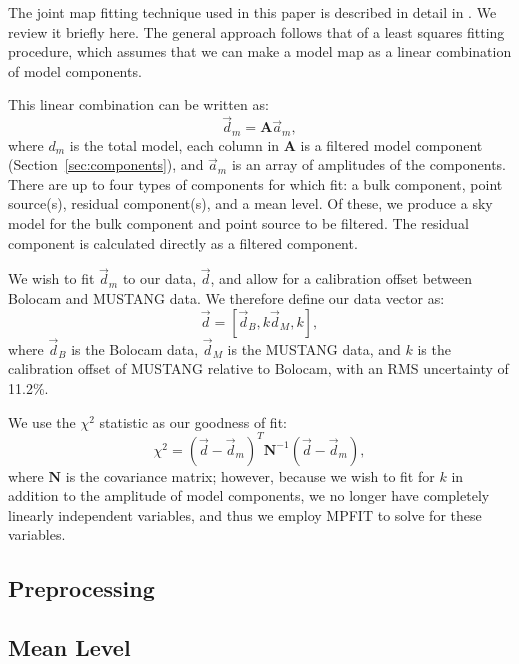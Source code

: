 \documentclass[iop,numberedappendix,apj]{emulateapj}
\begin{document}
The joint map fitting technique used in this paper is described in detail in \citet{romero2015a}. We review
it briefly here. The general approach follows that of a least squares fitting procedure, which assumes that
we can make a model map as a linear combination of model components. 

This linear combination can be written as:
\begin{equation}
  \vec{d}_m = \mathbf{A} \vec{a}_m,
\end{equation}
where $d_m$ is the total model, each column in $\mathbf{A}$ is a filtered model component (Section~\ref{sec:components}), 
and $\vec{a}_m$ is 
an array of amplitudes of the components. There are up to four types of components for which fit: 
a bulk component, point source(s), residual component(s), and a mean level. Of these, we produce a
sky model for the bulk component and point source to be filtered. The residual component is calculated 
directly as a filtered component.

We wish to fit $\vec{d}_m$ to our data, $\vec{d}$, and allow for a calibration offset between Bolocam and
MUSTANG data. We therefore define our data vector as:
\begin{equation}
  \vec{d} = [ \vec{d}_{B}, k \vec{d}_{M}, k ] ,
\end{equation}
where $\vec{d}_{B}$ is the Bolocam data, $\vec{d}_{M}$ is the MUSTANG data, and $k$ is the calibration offset of
MUSTANG relative to Bolocam, with an RMS uncertainty of 11.2\%.

We use the $\chi^2$ statistic as our goodness of fit:
\begin{equation}
  \chi^2 = (\overrightarrow{d} - \overrightarrow{d}_m)^T \mathbf{N}^{-1} (\overrightarrow{d} - \overrightarrow{d}_m),
\end{equation}
where $\mathbf{N}$ is the covariance matrix; however, because we wish to fit for $k$ in addition to the 
amplitude of model components, we no longer have
completely linearly independent variables, and thus we employ MPFIT \citep{markwardt2009} to solve for these
variables.

\subsection{Preprocessing}

\subsection{Mean Level}
\label{sec:mean_level}
\end{document}
